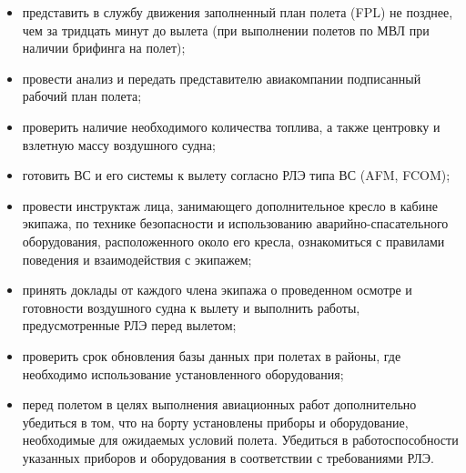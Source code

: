 \begin{itemize}
    \item представить в службу движения заполненный план полета (FPL) не позднее, чем за тридцать минут до вылета (при выполнении полетов по МВЛ при наличии брифинга на полет);
    \item провести анализ и передать представителю авиакомпании подписанный рабочий план полета;
    \item проверить наличие необходимого количества топлива, а также центровку и взлетную массу воздушного судна;
    \item готовить ВС и его системы к вылету согласно РЛЭ типа ВС (AFM, FCOM);
    \item провести инструктаж лица, занимающего дополнительное кресло в кабине экипажа, по технике безопасности и использованию аварийно-спасательного оборудования, расположенного около его кресла, ознакомиться с правилами поведения и взаимодействия с экипажем;
    \item принять доклады от каждого члена экипажа о проведенном осмотре и готовности воздушного судна к вылету и выполнить работы, предусмотренные РЛЭ перед вылетом;
    \item проверить срок обновления базы данных при полетах в районы, где необходимо использование  
установленного оборудования; 
\item перед полетом в целях выполнения авиационных работ дополнительно убедиться в том, что на борту установлены приборы и оборудование, необходимые для ожидаемых условий полета. Убедиться в работоспособности указанных приборов и оборудования в соответствии с требованиями РЛЭ.
\end{itemize}


